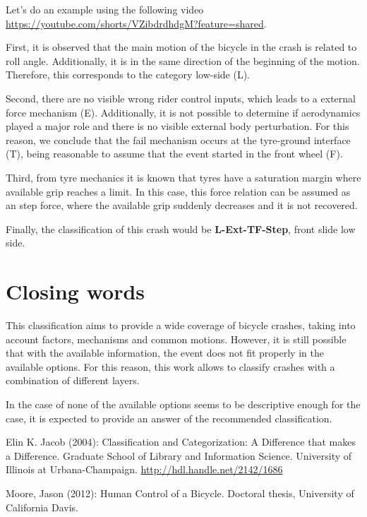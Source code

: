 \documentclass{article}
\begin{document}
Let's do an example using the following video \url{https://youtube.com/shorts/VZibdrdhdgM?feature=shared}.

First, it is observed that the main motion of the bicycle in the crash is related to roll angle.
%
Additionally, it is in the same direction of the beginning of the motion.
%
Therefore, this corresponds to the category low-side (L).


Second, there are no visible wrong rider control inputs, which leads to a external force mechanism (E).
%
Additionally, it is not possible to determine if aerodynamics played a major role and there is no visible external body perturbation.
%
For this reason, we conclude that the fail mechanism occurs at the tyre-ground interface (T), being reasonable to assume that the event started in the front wheel (F).


Third, from tyre mechanics it is known that tyres have a saturation margin where available grip reaches a limit.
%
In this case, this force relation can be assumed as an step force, where the available grip suddenly decreases and it is not recovered.


Finally, the classification of this crash would be \textbf{L-Ext-TF-Step}, front slide low side.


\section{Closing words}

This classification aims to provide a wide coverage of bicycle crashes, taking into account factors, mechanisms and common motions.
%
However, it is still possible that with the available information, the event does not fit properly in the available options.
%
For this reason, this work allows to classify crashes with a combination of different layers.


In the case of none of the available options seems to be descriptive enough for the case, it is expected to provide an answer of the recommended classification.


\begin{thebibliography}{9}

     Elin K. Jacob (2004):  Classification and Categorization: A Difference that makes a Difference. Graduate School of Library and Information Science. University of Illinois at Urbana-Champaign. \url{http://hdl.handle.net/2142/1686}

     Moore, Jason (2012): Human Control of a Bicycle. Doctoral thesis, University of California Davis.


\end{thebibliography}
\end{document}
